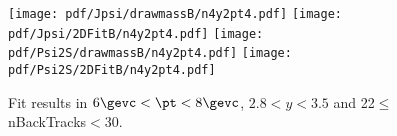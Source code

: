 \begin{figure}[H]
\begin{center}
\texttt{[image: pdf/Jpsi/drawmassB/n4y2pt4.pdf]}
\texttt{[image: pdf/Jpsi/2DFitB/n4y2pt4.pdf]}
\vspace*{-0.5cm}
\texttt{[image: pdf/Psi2S/drawmassB/n4y2pt4.pdf]}
\texttt{[image: pdf/Psi2S/2DFitB/n4y2pt4.pdf]}
\vspace*{-0.5cm}
\end{center}
\caption{Fit results in $6\gevc<\pt<8\gevc$, $2.8<y<3.5$ and 22$\leq$nBackTracks$<$30.}
\label{Fitn4y2pt4}
\end{figure}

